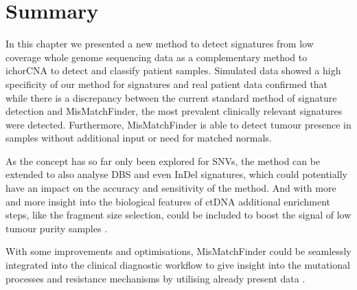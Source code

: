 \section{Summary}
In this chapter we presented a new method to detect signatures from low coverage whole genome sequencing data as a complementary method to ichorCNA to detect and classify patient samples. Simulated data showed a high specificity of our method for signatures and real patient data confirmed that while there is a discrepancy between the current standard method of signature detection and MisMatchFinder, the most prevalent clinically relevant signatures were detected. Furthermore, MisMatchFinder is able to detect tumour presence in samples without additional input or need for matched normals.

As the concept has so far only been explored for SNVs, the method can be extended to also analyse DBS and even InDel signatures, which could potentially have an impact on the accuracy and sensitivity of the method.
And with more and more insight into the biological features of ctDNA additional enrichment steps, like the fragment size selection, could be included to boost the signal of low tumour purity samples \cite{Markus2022}.

With some improvements and optimisations, MisMatchFinder could be seamlessly integrated into the clinical diagnostic workflow to give insight into the mutational processes and resistance mechanisms by utilising already present data \cite{Homburger2019,Chen2021}.
